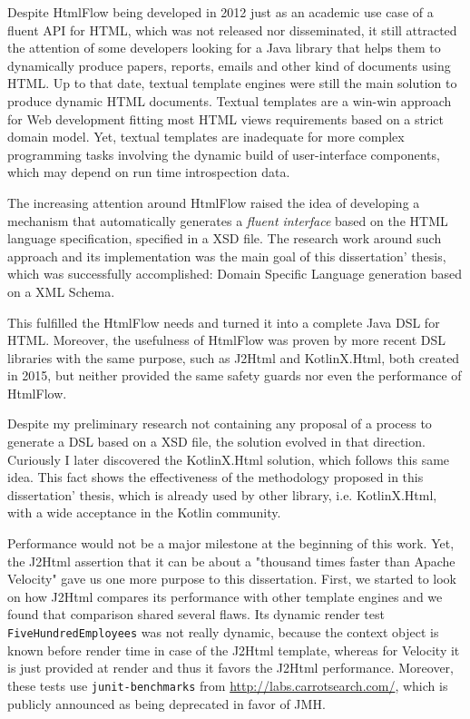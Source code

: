 \noindent
Despite HtmlFlow being developed in 2012 just as an academic use case of a fluent \ac{API} for \ac{HTML}, which was not released nor disseminated, it still attracted the attention of some developers looking for a Java library that helps them to dynamically produce papers, reports, emails and other kind of documents using \ac{HTML}. Up to that date, textual template engines were still the main solution to produce dynamic \ac{HTML} documents. Textual templates are a win-win approach for Web development fitting most \ac{HTML} views requirements based on a strict domain model. Yet, textual templates are inadequate for more complex programming tasks involving the dynamic build of user-interface components, which may depend on run time introspection data.

\noindent
The increasing attention around HtmlFlow raised the idea of developing a mechanism that automatically generates a \textit{fluent interface} based on the \ac{HTML} language specification, specified in a \ac{XSD} file. The research work around such approach and its implementation was the main goal of this dissertation' thesis, which was successfully accomplished: Domain Specific Language generation based on a XML Schema.

\noindent
This fulfilled the HtmlFlow needs and turned it into a complete Java \ac{DSL} for \ac{HTML}. Moreover, the usefulness of HtmlFlow was proven by more recent \ac{DSL} libraries with the same purpose, such as J2Html and KotlinX.Html, both created in 2015, but neither provided the same safety guards nor even the performance of HtmlFlow. 

\noindent
Despite my preliminary research not containing any proposal of a process to generate a \ac{DSL} based on a \ac{XSD} file, the solution evolved in that direction. Curiously I later discovered the KotlinX.Html solution, which follows this same idea. This fact shows the effectiveness of the methodology proposed in this dissertation' thesis, which is already used by other library, i.e. KotlinX.Html, with a wide acceptance in the Kotlin community.

\noindent
Performance would not be a major milestone at the beginning of this work. Yet, the J2Html assertion that it can be about a "thousand times faster than Apache Velocity" gave us one more purpose to this dissertation. First, we started to look on how J2Html compares its performance with other template engines and we found that comparison shared several flaws. Its dynamic render test \texttt{FiveHundredEmployees} was not really dynamic, because the context object is known before render time in case of the J2Html template, whereas for Velocity it is just provided at render and thus it favors the J2Html performance. Moreover, these tests use \texttt{junit-benchmarks} from \url{http://labs.carrotsearch.com/}, which is publicly announced as being deprecated in favor of \ac{JMH}.


